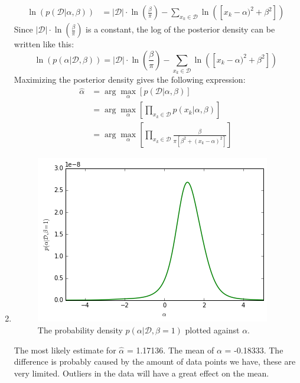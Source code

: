 \documentclass[a4paper,10pt]{article}
\numberwithin{equation}{section} %
\numberwithin{figure}{section} %
\numberwithin{table}{section} %
\theoremstyle{mytheor}
\begin{document}
\begin{enumerate}
\begin{align}
		\ln(p(\mathcal{D} | \alpha, \beta)) &= \bigg \vert \mathcal{D}\bigg \vert \cdot \ln(\frac{\beta}{\pi}) - \sum_{x_k \in \mathcal{D}} \ln([x_k - \alpha)^2 + \beta^2])
		\end{align}
		Since $\bigg \vert \mathcal{D}\bigg \vert \cdot \ln(\frac{\beta}{\pi})$ is a constant, the log of the posterior density can be written like this:
		\begin{equation}
		\ln(p(\alpha | \mathcal{D}, \beta)) = \bigg \vert \mathcal{D}\bigg \vert \cdot \ln(\frac{\beta}{\pi}) - \sum_{x_k \in \mathcal{D}} \ln([x_k - \alpha)^2 + \beta^2]) \tag{Assignment eq. 9}
		\end{equation}
		Maximizing the posterior density gives the following expression:
		\begin{align}
		\hat \alpha &= \arg \max_\alpha [p(\mathcal{D} | \alpha, \beta)]\\
		&= \arg \max_\alpha [\prod_{x_k \in \mathcal{D}} p(x_k | \alpha, \beta)]\\
		&= \arg \max_\alpha [\prod_{x_k \in \mathcal{D}} \frac{\beta}{\pi[\beta^2 + (x_k - \alpha)^2]}]
		\end{align}
	\item \begin{figure}[h!]
   			\centering
   			\includegraphics{alpharoni.png}\vspace{-0.2cm}
   			\caption{\vspace{-0.2cm} The probability density $p(\alpha | \mathcal{D}, \beta = 1)$ plotted against $\alpha$.}
  		\end{figure}
  		The most likely estimate for $\hat{\alpha}$ = 1.17136. The mean of $\alpha$ = -0.18333. The difference is probably caused by the amount of data points we have, these are very limited. Outliers in the data will have a great effect on the mean.
\end{enumerate}
\end{document}
